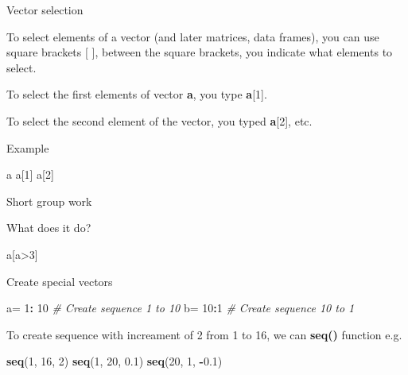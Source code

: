 \documentclass[ignorenonframetext,]{beamer}
\newenvironment{Shaded}{\begin{snugshade}}{\end{snugshade}}
\newcommand{\KeywordTok}[1]{\textcolor[rgb]{0.13,0.29,0.53}{\textbf{#1}}}
\newcommand{\DecValTok}[1]{\textcolor[rgb]{0.00,0.00,0.81}{#1}}
\newcommand{\FloatTok}[1]{\textcolor[rgb]{0.00,0.00,0.81}{#1}}
\newcommand{\StringTok}[1]{\textcolor[rgb]{0.31,0.60,0.02}{#1}}
\newcommand{\CommentTok}[1]{\textcolor[rgb]{0.56,0.35,0.01}{\textit{#1}}}
\newcommand{\OperatorTok}[1]{\textcolor[rgb]{0.81,0.36,0.00}{\textbf{#1}}}
\newcommand{\NormalTok}[1]{#1}
\begin{document}
\begin{frame}[fragile]{Vector selection}

To select elements of a vector (and later matrices, data frames), you
can use square brackets {[} {]}, between the square brackets, you
indicate what elements to select.

To select the first elements of vector \textbf{a}, you type
\textbf{a}{[}1{]}.

To select the second element of the vector, you typed \textbf{a}{[}2{]},
etc.

\begin{block}{Example}

\begin{Shaded}
\begin{Highlighting}[]
\NormalTok{a}
\NormalTok{a[}\DecValTok{1}\NormalTok{]}
\NormalTok{a[}\DecValTok{2}\NormalTok{]}
\end{Highlighting}
\end{Shaded}

\end{block}

\end{frame}

\begin{frame}[fragile]{Short group work}

\begin{block}{What does it do?}

a{[}a\textgreater{}3{]}

\end{block}

\begin{block}{Create special vectors}

\begin{Shaded}
\begin{Highlighting}[]
\NormalTok{a=}\StringTok{ }\DecValTok{1}\OperatorTok{:}\StringTok{ }\DecValTok{10} \CommentTok{# Create sequence 1 to 10}
\NormalTok{b=}\StringTok{ }\DecValTok{10}\OperatorTok{:}\DecValTok{1} \CommentTok{# Create sequence 10 to 1}
\end{Highlighting}
\end{Shaded}

To create sequence with increament of 2 from 1 to 16, we can
\textbf{seq()} function e.g.

\begin{Shaded}
\begin{Highlighting}[]
\KeywordTok{seq}\NormalTok{(}\DecValTok{1}\NormalTok{, }\DecValTok{16}\NormalTok{, }\DecValTok{2}\NormalTok{)}
\KeywordTok{seq}\NormalTok{(}\DecValTok{1}\NormalTok{, }\DecValTok{20}\NormalTok{, }\FloatTok{0.1}\NormalTok{)}
\KeywordTok{seq}\NormalTok{(}\DecValTok{20}\NormalTok{, }\DecValTok{1}\NormalTok{, }\OperatorTok{-}\FloatTok{0.1}\NormalTok{)}
\end{Highlighting}
\end{Shaded}

\end{block}

\end{frame}
\end{document}
